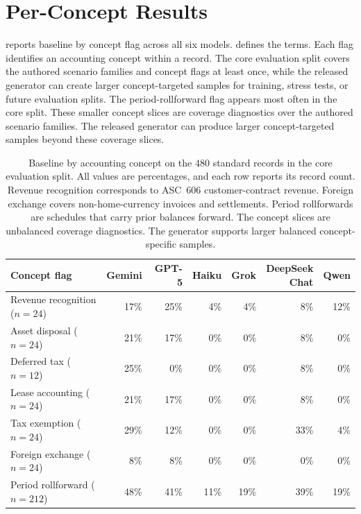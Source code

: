 \section{Per-Concept Results}
\label{appx:per-concept}

 reports baseline \bsrecon{} by concept flag across all six models.  defines the terms. Each flag identifies an accounting concept within a record. The core evaluation split covers the authored scenario families and concept flags at least once, while the released generator can create larger concept-targeted samples for training, stress tests, or future evaluation splits. The period-rollforward flag appears most often in the core split. These smaller concept slices are coverage diagnostics over the authored scenario families. The released generator can produce larger concept-targeted samples beyond these coverage slices.

\begin{table}[t]
\centering
\footnotesize
\setlength{\tabcolsep}{5pt}
\renewcommand{\arraystretch}{1.02}
\begin{tabular}{@{}lrrrrrr@{}}
\toprule
Concept flag & Gemini & GPT-5 & Haiku & Grok & \shortstack{DeepSeek\\Chat} & Qwen \\
\midrule
Revenue recognition ($n{=}24$) & 17\% & 25\% & 4\%  & 4\%  & 8\%  & 12\% \\
Asset disposal ($n{=}24$)      & 21\% & 17\% & 0\%  & 0\%  & 8\%  & 0\%  \\
Deferred tax ($n{=}12$)        & 25\% & 0\%  & 0\%  & 0\%  & 8\%  & 0\%  \\
Lease accounting ($n{=}24$)    & 21\% & 17\% & 0\%  & 0\%  & 8\%  & 0\%  \\
Tax exemption ($n{=}24$)       & 29\% & 12\% & 0\%  & 0\%  & 33\% & 4\%  \\
Foreign exchange ($n{=}24$)    & 8\%  & 8\%  & 0\%  & 0\%  & 0\%  & 0\%  \\
Period rollforward ($n{=}212$) & 48\% & 41\% & 11\% & 19\% & 39\% & 19\% \\
\bottomrule
\end{tabular}
\caption{Baseline \bsrecon{} by accounting concept on the $480$ standard records in the core evaluation split. All values are percentages, and each row reports its record count. Revenue recognition corresponds to ASC~606 customer-contract revenue. Foreign exchange covers non-home-currency invoices and settlements. Period rollforwards are schedules that carry prior balances forward. The concept slices are unbalanced coverage diagnostics. The generator supports larger balanced concept-specific samples.}
\label{tab:per-concept}
\end{table}

